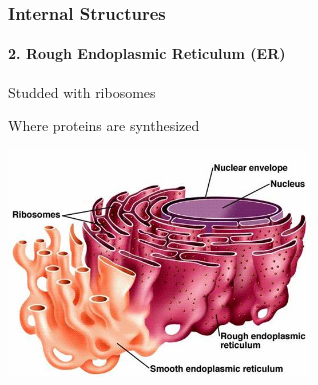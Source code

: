\documentclass[10pt]{beamer}
\begin{document}
\begin{frame}[t]
\frametitle{Internal Structures}
\framesubtitle{2. Rough Endoplasmic Reticulum (ER)}
\vspace{0.5cm}

	Studded with ribosomes\\
	
	\vspace{0.5cm}
	
	Where proteins are synthesized\\
	
	\vspace{0.2cm}
	
	\begin{center}
		\includegraphics[width=0.6\textwidth]{figures/roughER.jpg}
	\end{center}

\end{frame}
\end{document}
